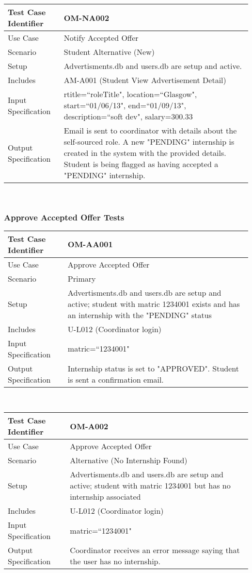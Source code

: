 \documentclass{l3deliverable}
\begin{document}
\begin{tabular}{lp{10cm}}
\hline 
\textbf{Test Case Identifier} & OM-NA002\tabularnewline
\hline 
\hline 
Use Case & Notify Accepted Offer \tabularnewline
\hline 
Scenario & Student Alternative (New) \tabularnewline
\hline 
Setup & Advertisments.db and users.db are setup and active.\tabularnewline
\hline 
Includes & AM-A001 (Student View Advertisement Detail) \tabularnewline
\hline 
Input Specification & rtitle=``roleTitle", location=``Glasgow", start=``01/06/13", end=``01/09/13", description=``soft dev", salary=300.33 \tabularnewline
\hline 
Output Specification & Email is sent to coordinator with details about the self-sourced role. A new "PENDING" internship is created in the system with the provided details. Student is being flagged as having accepted a "PENDING" internship.\tabularnewline
\hline 
\end{tabular}\\

\subsubsection{Approve Accepted Offer Tests}

\begin{tabular}{lp{10cm}}
\hline 
\textbf{Test Case Identifier} & OM-AA001\tabularnewline
\hline 
\hline 
Use Case & Approve Accepted Offer\tabularnewline
\hline 
Scenario & Primary \tabularnewline
\hline 
Setup & Advertisments.db and users.db are setup and active; student with matric 1234001 exists and has an internship with the "PENDING" status\tabularnewline
\hline 
Includes & U-L012 (Coordinator login) \tabularnewline
\hline 
Input Specification &  matric=``1234001" \tabularnewline
\hline 
Output Specification & Internship status is set to "APPROVED". Student is sent a confirmation email.\tabularnewline
\hline 
\end{tabular}\\


\begin{tabular}{lp{10cm}}
\hline 
\textbf{Test Case Identifier} & OM-A002\tabularnewline
\hline 
\hline 
Use Case & Approve Accepted Offer\tabularnewline
\hline 
Scenario & Alternative (No Internship Found) \tabularnewline
\hline 
Setup & Advertisments.db and users.db are setup and active; student with matric 1234001 but has no internship associated\tabularnewline
\hline 
Includes & U-L012 (Coordinator login) \tabularnewline
\hline 
Input Specification &  matric=``1234001" \tabularnewline
\hline 
Output Specification & Coordinator receives an error message saying that the user has no internship. \tabularnewline
\hline 
\end{tabular}\\
\end{document}
